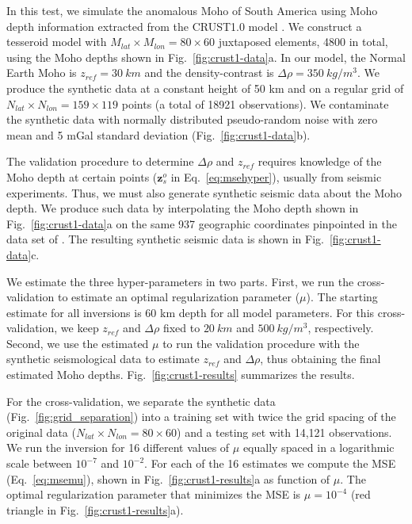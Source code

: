 \documentclass[extra,mreferee]{gji}
\begin{document}
In this test, we simulate the anomalous Moho of South America
using Moho depth information extracted from the CRUST1.0 model
\citep{laske2013}.
We construct a tesseroid model with
$M_{lat} \times M_{lon} = 80 \times 60$ juxtaposed elements, 4800 in total,
using the Moho depths shown in Fig.~\ref{fig:crust1-data}a.
In our model, the Normal Earth Moho is $z_{ref} = 30\ km$ and
the density-contrast is $\Delta\rho = 350\ kg/m^3$.
We produce the synthetic data at a constant height of 50 km
and on a regular grid of $N_{lat} \times N_{lon} = 159 \times 119$ points
(a total of 18921 observations).
We contaminate the synthetic data with normally distributed pseudo-random noise
with zero mean and 5 mGal standard deviation (Fig.~\ref{fig:crust1-data}b).

The validation procedure to determine $\Delta\rho$ and $z_{ref}$
requires knowledge of the Moho depth at certain points
($\mathbf{z}_s^o$ in Eq.~\ref{eq:msehyper}),
usually from seismic experiments.
Thus, we must also generate synthetic seismic data about the Moho depth.
We produce such data by interpolating the Moho depth shown in
Fig.~\ref{fig:crust1-data}a on the same 937 geographic coordinates
pinpointed in the data set of \citet{assumpcao2013a}.
The resulting synthetic seismic data is shown in Fig.~\ref{fig:crust1-data}c.

We estimate the three hyper-parameters in two parts.
First, we run the cross-validation to estimate
an optimal regularization parameter ($\mu$).
The starting estimate for all inversions is
60 km depth for all model parameters.
For this cross-validation,
we keep $z_{ref}$ and $\Delta\rho$ fixed to
$20\ km$ and $500\ kg/m^3$, respectively.
Second, we use the estimated $\mu$ to run the validation
procedure with the synthetic seismological data
to estimate $z_{ref}$ and $\Delta\rho$,
thus obtaining the final estimated Moho depths.
Fig.~\ref{fig:crust1-results} summarizes the results.

For the cross-validation,
we separate the synthetic data (Fig.~\ref{fig:grid_separation}) into
a training set with twice the grid spacing of the original data
($N_{lat} \times N_{lon} = 80 \times 60$)
and a testing set with 14,121 observations.
We run the inversion for 16 different values of $\mu$
equally spaced in a logarithmic scale between $10^{-7}$ and $10^{-2}$.
For each of the 16 estimates we compute the MSE (Eq.~\ref{eq:msemu}),
shown in Fig.~\ref{fig:crust1-results}a as function of $\mu$.
The optimal regularization parameter that minimizes the MSE is $\mu = 10^{-4}$
(red triangle in Fig.~\ref{fig:crust1-results}a).
\end{document}
